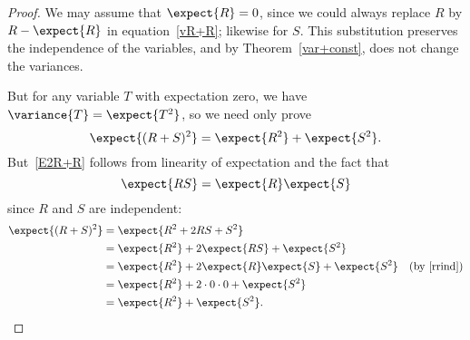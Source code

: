 \begin{proof}
We may assume that $\expect{R} = 0$, since we could always replace $R$
by $R-\expect{R}$ in equation~\eqref{vR+R}; likewise for $S$.  This
substitution preserves the independence of the variables, and by
Theorem~\ref{var+const}, does not change the variances.

But for any variable $T$ with expectation zero, we have $\variance{T}
= \expect{T^2}$, so we need only prove
\begin{equation}\label{E2R+R}
\expect{(R+S)^2} = \expect{R^2} + \expect{S^2}.
\end{equation}
But~\eqref{E2R+R} follows from linearity of expectation and the fact that
\begin{equation}\label{rrind}
\expect{RS} = \expect{R}\expect{S}
\end{equation}
since $R$ and $S$ are independent:
\begin{align*}
\expect{(R+S)^2}
   & = \expect{R^2+2RS +S^2}\\
   & = \expect{R^2}+2\expect{RS} +\expect{S^2}\\
   & = \expect{R^2}+2\expect{R}\expect{S} +\expect{S^2}
             & \text{(by~\eqref{rrind})}\\
   & = \expect{R^2}+2\cdot 0 \cdot 0 +\expect{S^2}\\
   & = \expect{R^2} + \expect{S^2}.
\end{align*}

\iffalse
We will transform the left side into the right side.  We begin by
applying the alternate definition of variance.
\[
\variance{R + S} = \expect{(R + S)^2} - \expectsq{R + S}.
\]

We will work on the first term and then the second term separately.
For the first term, note\begin{eqnarray*}
\expect{(R+S)^2}
& = &   \expect{R^2 + 2 R S + S^2} \\
& = &   \expect{R^2} + \expect{2 R S} + \expect{S^2} \\
& = &   \expect{R^2} + 2 \expect{R} \expect{S} + \expect{S^2}.
\end{eqnarray*}
First, we multiply out the squared expression.  The second step uses
linearity of expectation.  In the last step, we break the
expectation of the product $R S$ into a product of expectations;
this is where we use the fact that $R$ and $S$ are independent.
Now we work on the second term.
\begin{eqnarray*}
\expectsq{R+S} & = & (\expect{R} + \expect{S})^2 \\
& = & \expectsq{R} + 2 \expect{R} \expect{S} + \expectsq{S}.
n\end{eqnarray*}
The first step uses linearity of expectation, and in the second step
we multiply out the squared expression.  Now we subtract the
(expanded) second term from the first. Cancelling and rearranging
terms, we find that
\begin{eqnarray*}
\variance{R + S} & = &   (\expect{R^2} - \expectsq{R}) +
(\expect{S^2}) - \expectsq{S}) \\
& = &   \variance{R} + \variance{S}.
\end{eqnarray*}
\fi
\end{proof}

